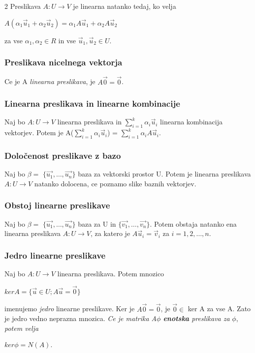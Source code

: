 \documentclass{article}
\begin{document}
\begin{multicols}{2}
	Preslikava $A: U \rightarrow V$ je linearna natanko tedaj, ko velja
	\begin{center}
		$A(\alpha_{1}\vec{u}_{1} + \alpha_{2}\vec{u}_{2}) = \alpha_{1}A\vec{u}_{1} + \alpha_{2}A\vec{u}_{2}$
	\end{center}
	za vse $\alpha_{1}, \alpha_{2} \in R$ in vse $\vec{u}_{1}, \vec{u}_{2} \in U$.

	\subsubsection{Preslikava nicelnega vektorja}

	Ce je A \textit{linearna preslikava}, je $A\vec{0} = \vec{0}$.

	\subsubsection{Linearna preslikava in linearne kombinacije}

	Naj bo $A: U \rightarrow V$ linearna preslikava in $\sum_{i=1}^{k} \alpha_{i}\vec{u}_{i}$
	linearna kombinacija vektorjev. Potem je A($\sum_{i=1}^{k} \alpha_{i}\vec{u}_{i}$) = $\sum_{i=1}^{k} \alpha_{i}A\vec{u}_{i}$.

	\subsubsection{Določenost preslikave z bazo}

	Naj bo $\beta =$ $\{ \vec{u_{1}}, \dots,\vec{u_{n}}\}$ baza za vektorski prostor U. Potem je linearna
	preslikava $A: U \rightarrow V$ natanko dolocena, ce poznamo slike baznih vektorjev.

	\subsubsection{Obstoj linearne preslikave}

	Naj bo $\beta =$ $\{\vec{u_{1}}, \dots,\vec{u_{n}}\}$ baza za U in $\{\vec{v_{1}}, \dots,\vec{v_{n}}\}$.
	Potem obstaja natanko ena linearna preslikava $A: U \rightarrow V$, za katero je $A\vec{u}_{i} = \vec{v}_{i}$ za $i = 1, 2, \dots, n$.

	\subsubsection{Jedro linearne preslikave}

	Naj bo $A: U \rightarrow V$ linearna preslikava. Potem mnozico
	\begin{center}
		$ker A = \{ \vec{u} \in U; A\vec{u} = \vec{0}\}$
	\end{center}
	imenujemo \textit{jedro} linearne preslikave. Ker je $A\vec{0} = \vec{0}$, je $\vec{0} \in$ ker A za vse A.
	Zato je jedro vedno neprazna mnozica.
	\textit{Ce je matrika A$\phi$ \textbf{enotska} preslikava za } $\phi$, \textit{potem velja}
	\begin{center}
		\begin{math}
			ker \phi = N(A).
		\end{math}
	\end{center}


\end{multicols}
\end{document}
